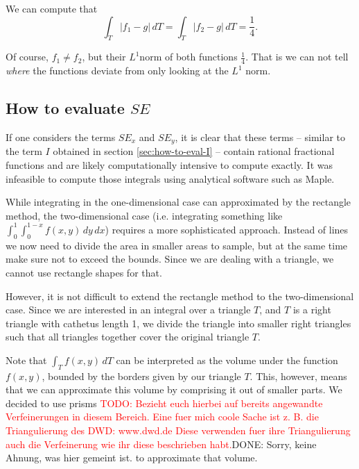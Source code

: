 \documentclass{article}
\newcommand{\todo}[2][]{\textcolor{red}{TODO\ifthenelse{\equal{#1}{}}{}{[#1]}: #2}}
\newcommand{\done}[2][]{\textcolor{green!50!black}{DONE\ifthenelse{\equal{#1}{}}{}{[#1]}: #2}}
\begin{document}
We can compute that 
\begin{equation*}
  \int_T \left| f_1 - g \right| \, dT = \int_T \left| f_2 - g \right| \, dT = \frac{1}{4}.
\end{equation*}

Of course, $f_1 \neq f_2$, but their $L^1$norm of both functions $\frac{1}{4}$. That is we can not tell \emph{where} the functions deviate from only looking at the $L^1$ norm.



\subsection{\texorpdfstring{How to evaluate $SE$}{How to evaluate SE}}
\label{sec:how-to-evaluate-e}

If one considers the terms $SE_x$ and $SE_y$, it is clear that these terms -- similar to the term $I$ obtained in section \ref{sec:how-to-eval-I} -- contain rational fractional functions and are likely computationally intensive to compute exactly.
It was infeasible to compute those integrals using analytical software such as Maple.

While integrating in the one-dimensional case can approximated by the rectangle method, the two-dimensional case (i.e. integrating something like $\int_{0}^1 \int_0^{1-x} f(x,y)\, dy\, dx$) requires a more sophisticated approach. Instead of lines we now need to divide the area in smaller areas to sample, but at the same time make sure not to exceed the bounds. Since we are dealing with a triangle, we cannot use rectangle shapes for that.

However, it is not difficult to extend the rectangle method to the two-dimensional case. Since we are interested in an integral over a triangle $T$, and $T$ is a right triangle with cathetus length 1, we divide the triangle into smaller right triangles such that all triangles together cover the original triangle $T$.

Note that $\int_T f(x,y)\,dT$ can be interpreted as the volume under the function $f(x,y)$, bounded by the borders given by our triangle $T$. This, however, means that we can approximate this volume by comprising it out of smaller parts. We decided to use prisms \todo{Bezieht euch hierbei auf bereits angewandte Verfeinerungen in diesem Bereich. Eine fuer mich coole Sache ist z. B. die Triangulierung des DWD: www.dwd.de Diese verwenden fuer ihre Triangulierung auch die Verfeinerung wie ihr diese beschrieben habt.}\done{Sorry, keine Ahnung, was hier gemeint ist.} to approximate that volume.
\end{document}
